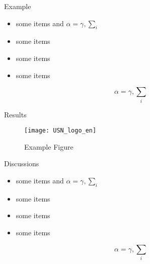 \documentclass{beamer}
\begin{document}
\begin{frame}{}
\begin{columns}[c]
    \begin{column}{0.5\linewidth}
      \begin{block}{Example}
        \begin{itemize}
        \item some items and $\alpha=\gamma, \sum_{i}$
        \item some items
        \item some items
        \item some items
        \end{itemize}
        $$\alpha=\gamma, \sum_{i}$$
      \end{block}
      \vskip1cm
      \begin{block}{Results}
        \begin{figure}[h]
          \texttt{[image: USN\_logo\_en]}
          \caption{Example Figure}
        \end{figure}
      \end{block}
      \vskip1cm
      \begin{block}{Discussions}
        \begin{itemize}
        \item some items and $\alpha=\gamma, \sum_{i}$
        \item some items
        \item some items
        \item some items
        \end{itemize}
        $$\alpha=\gamma, \sum_{i}$$
      \end{block}
    \end{column}
  \end{columns}
\end{frame}
\end{document}

